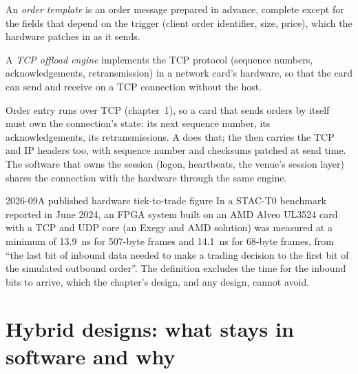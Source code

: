 \begin{definition}\label{def:nw:programmable-hardware-ii-trading-designs:template}
An \emph{order template} is an order message prepared in advance, complete except for the fields that depend on
the trigger (client order identifier, size, price), which the hardware patches in as it sends.
\end{definition}

\begin{definition}\label{def:nw:programmable-hardware-ii-trading-designs:toe}
A \emph{TCP offload engine} implements the TCP protocol (sequence numbers, acknowledgements, retransmission)
in a network card's hardware, so that the card can send and receive on a TCP connection without the host.
\end{definition}

Order entry runs over TCP (chapter~1), so a card that sends orders by itself must own the connection's state: its next sequence
number, its acknowledgements, its retransmissions. A  does that; the  then carries the TCP and IP
headers too, with sequence number and checksums patched at send time. The software that owns the session (logon, heartbeats, the
venue's session layer) shares the connection with the hardware through the same engine.

\begin{dated}{2026-09}{A published hardware tick-to-trade figure}\label{dat:nw:programmable-hardware-ii-trading-designs:stac}
In a STAC-T0 benchmark reported in June 2024, an FPGA system built on an AMD Alveo UL3524 card with a TCP and UDP core (an Exegy and AMD
solution) was measured at a minimum of \qty{13.9}{\nano\second} for 507-byte frames and \qty{14.1}{\nano\second} for 68-byte frames, from
``the last bit of inbound data needed to make a trading decision to the first bit of the simulated outbound order''. The definition
excludes the time for the inbound bits to arrive, which the chapter's design, and any design, cannot avoid.
\end{dated}

\section{Hybrid designs: what stays in software and why}


